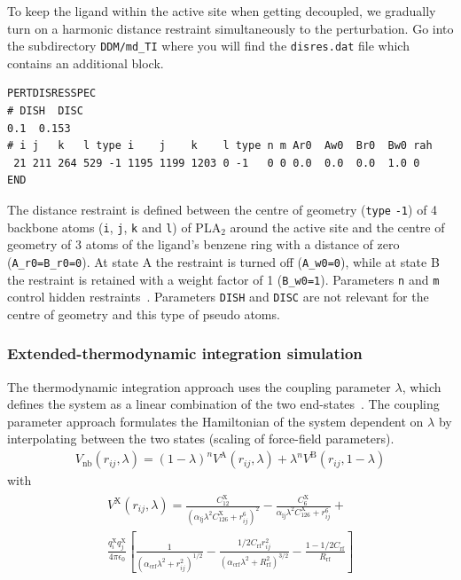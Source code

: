 To keep the ligand within the active site when getting decoupled, we gradually turn on a harmonic distance restraint simultaneously to the perturbation. Go into the subdirectory \texttt{DDM/md\_TI} where you will find the \texttt{disres.dat} file which contains an additional block.
\begin{lstlisting}
PERTDISRESSPEC
# DISH  DISC
0.1  0.153
# i j   k   l type i    j    k    l type n m Ar0  Aw0  Br0  Bw0 rah
 21 211 264 529 -1 1195 1199 1203 0 -1   0 0 0.0  0.0  0.0  1.0 0
END 
\end{lstlisting}

The distance restraint is defined between the centre of geometry (\texttt{type} \texttt{-1}) of 4 backbone atoms (\texttt{i}, \texttt{j}, \texttt{k} and \texttt{l}) of PLA$_2$ around the active site and the centre of geometry of 3 atoms of the ligand's benzene ring with a distance of zero (\texttt{A\_r0=B\_r0=0}). At state A the restraint is turned off (\texttt{A\_w0=0}), while at state B the restraint is retained with a weight factor of 1 (\texttt{B\_w0=1}). Parameters \texttt{n} and \texttt{m} control hidden 
restraints~\cite{Christen}. Parameters \texttt{DISH} and \texttt{DISC} are not relevant for the centre of geometry and this type of pseudo atoms.

\subsubsection{Extended-thermodynamic integration simulation} \label{chapt:exTI}
The thermodynamic integration approach uses the coupling parameter $\lambda$, which defines the system as a linear combination of the two end-states~\cite{kirkwood_TI}. The coupling parameter approach formulates the Hamiltonian of the system dependent on $\lambda$ by interpolating between the two states (scaling of force-field parameters). \\

\begin{align}
\label{equ:ext_ti}
V_{\text{nb}}(r_{ij},\lambda) = (1-\lambda)^n V^{\text{A}}(r_{ij},\lambda) + \lambda^n V^{\text{B}}(r_{ij},1-\lambda)
\end{align}
with
\begin{align}\begin{split}
V^{\text{X}}(r_{ij},\lambda) = \frac{C_{12}^{\text{X}}}{(\alpha_{\text{lj}}\lambda^2 C_{126}^{\text{X}} + r_{ij}^6)^2} - \frac{C_{6}^{\text{X}}}{\alpha_{\text{lj}}\lambda^2 C_{126}^{\text{X}} + r_{ij}^6} + \\
 \frac{q_i^{\text{X}} q_j^{\text{X}}}{4 \pi \epsilon_0} \left \lbrack \frac{1}{(\alpha_{\text{crf}}\lambda^2 + r_{ij}^2)^{1/2}} - \frac{1/2 C_{\text{rf}}r_{ij}^2}{(\alpha_{\text{crf}} \lambda^2 + R_{\text{rf}}^2)^{3/2}} - \frac{1 - 1/2C_{\text{rf}}}{R_{\text{rf}}} \right \rbrack
\end{split}\end{align}

